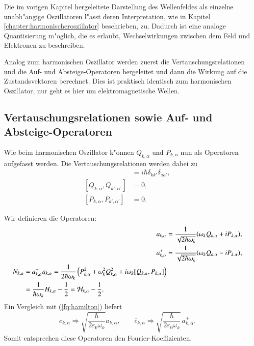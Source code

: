 \begin{refsection}
Die im vorigen Kapitel hergeleitete Darstellung des Wellenfeldes als einzelne unabh"angige Oszillatoren l"asst deren Interpretation, wie in Kapitel \ref{chapter:harmonischeroszillator} beschrieben, zu. Dadurch ist eine analoge Quantisierung m"oglich, die es erlaubt, Wechselwirkungen zwischen dem Feld und Elektronen zu beschreiben.

Analog zum harmonischen Oszillator werden zuerst die Vertauschungsrelationen und die Auf- und Absteige-Operatoren hergeleitet und dann die Wirkung auf die Zustandsvektoren berechnet. Dies ist praktisch identisch zum harmonischen Oszillator, nur geht es hier um elektromagnetische Wellen.

\subsection{Vertauschungsrelationen sowie Auf- und Absteige-Operatoren}
Wie beim harmonischen Oszillator k"onnen $Q_{k,\alpha}$ und $P_{k,\alpha}$ nun als Operatoren aufgefasst werden. Die Vertauschungsrelationen werden dabei zu
\begin{align*}
[Q_{k,\alpha}, P_{k',\alpha'}] &= i \hbar \delta_{kk'}\delta_{aa'}, \\
[Q_{k,\alpha}, Q_{k',\alpha'}] &= 0, \\
[P_{k,\alpha}, P_{k',\alpha'}] &= 0.
\end{align*}

Wir definieren die Operatoren:
\begin{align*}
a_{k,\alpha} &= \frac{1}{\sqrt{2 \hbar \omega_k}} (\omega_k Q_{k,\alpha} + iP_{k,\alpha}), \\
a^+_{k,\alpha} &= \frac{1}{\sqrt{2 \hbar \omega_k}} (\omega_k Q_{k,\alpha} - iP_{k,\alpha}),\\
\begin{split}
N_{k,\alpha} &= a^+_{k,\alpha} a_{k,\alpha} = \frac{1}{2 \hbar \omega_k} \left(P_{k,\alpha}^2 + \omega_k^2 Q_{k,\alpha}^2 + i\omega_k [Q_{k,\alpha},P_{k,\alpha}] \right) \\
 &= \frac{1}{ \hbar \omega_k } H_{k,\alpha} - \frac{1}{2} = {\cal H}_{k,\alpha} - \frac{1}{2}.
\end{split}
\end{align*}
Ein Vergleich mit (\ref{fq:hamilton}) liefert
\begin{equation} \label{fq:opp_fourier}
 c_{k,\alpha} \Rightarrow \sqrt{\frac{\hbar}{2 \varepsilon_0 \omega_k}} a_{k,\alpha}, \qquad 
 \bar{c}_{k,\alpha} \Rightarrow \sqrt{\frac{\hbar}{2 \varepsilon_0 \omega_k}} \, a^+_{k,\alpha}.
\end{equation}
Somit entsprechen diese Operatoren den Fourier-Koeffizienten.


\end{refsection}

